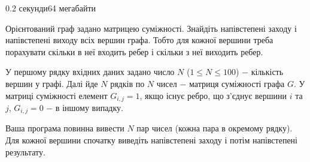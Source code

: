 \begin{problem}{}{}{}{0.2 секунди}{64 мегабайти}

Орієнтований граф задано матрицею суміжності. Знайдіть напівстепені заходу і напівстепені виходу всіх вершин графа.
Тобто для кожної вершини треба порахувати скільки в неї входить ребер і скільки з неї виходить ребер.

\InputFile
У першому рядку вхідних даних задано число $N$ ($1 \le N \le 100$) $-$ кількість вершин у графі.
Далі йде $N$ рядків по $N$ чисел $-$ матриця суміжності графа $G$. У матриці суміжності елемент $G_{i,j}=1$, якщо
існує ребро, що з'єднує вершини $i$ та $j$, $G_{i,j}=0$ $-$ в іншому випадку.

\OutputFile
Ваша програма повинна вивести $N$ пар чисел (кожна пара в окремому рядку). Для кожної вершини спочатку виведіть 
напівстепені заходу і потім напівстепені результату.

\Example

\begin{example}
%
\end{example}

\end{problem}

